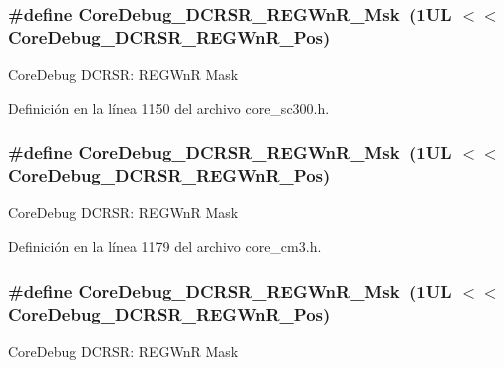 \subsubsection[{\texorpdfstring{Core\+Debug\+\_\+\+D\+C\+R\+S\+R\+\_\+\+R\+E\+G\+Wn\+R\+\_\+\+Msk}{CoreDebug_DCRSR_REGWnR_Msk}}]{\setlength{\rightskip}{0pt plus 5cm}\#define Core\+Debug\+\_\+\+D\+C\+R\+S\+R\+\_\+\+R\+E\+G\+Wn\+R\+\_\+\+Msk~(1\+U\+L $<$$<$ Core\+Debug\+\_\+\+D\+C\+R\+S\+R\+\_\+\+R\+E\+G\+Wn\+R\+\_\+\+Pos)}\hypertarget{group___c_m_s_i_s___core_debug_ga1eef4992d8f84bc6c0dffed1c87f90a5}{}\label{group___c_m_s_i_s___core_debug_ga1eef4992d8f84bc6c0dffed1c87f90a5}
Core\+Debug D\+C\+R\+SR\+: R\+E\+G\+WnR Mask 

Definición en la línea 1150 del archivo core\+\_\+sc300.\+h.

\subsubsection[{\texorpdfstring{Core\+Debug\+\_\+\+D\+C\+R\+S\+R\+\_\+\+R\+E\+G\+Wn\+R\+\_\+\+Msk}{CoreDebug_DCRSR_REGWnR_Msk}}]{\setlength{\rightskip}{0pt plus 5cm}\#define Core\+Debug\+\_\+\+D\+C\+R\+S\+R\+\_\+\+R\+E\+G\+Wn\+R\+\_\+\+Msk~(1\+U\+L $<$$<$ Core\+Debug\+\_\+\+D\+C\+R\+S\+R\+\_\+\+R\+E\+G\+Wn\+R\+\_\+\+Pos)}\hypertarget{group___c_m_s_i_s___core_debug_ga1eef4992d8f84bc6c0dffed1c87f90a5}{}\label{group___c_m_s_i_s___core_debug_ga1eef4992d8f84bc6c0dffed1c87f90a5}
Core\+Debug D\+C\+R\+SR\+: R\+E\+G\+WnR Mask 

Definición en la línea 1179 del archivo core\+\_\+cm3.\+h.

\subsubsection[{\texorpdfstring{Core\+Debug\+\_\+\+D\+C\+R\+S\+R\+\_\+\+R\+E\+G\+Wn\+R\+\_\+\+Msk}{CoreDebug_DCRSR_REGWnR_Msk}}]{\setlength{\rightskip}{0pt plus 5cm}\#define Core\+Debug\+\_\+\+D\+C\+R\+S\+R\+\_\+\+R\+E\+G\+Wn\+R\+\_\+\+Msk~(1\+U\+L $<$$<$ Core\+Debug\+\_\+\+D\+C\+R\+S\+R\+\_\+\+R\+E\+G\+Wn\+R\+\_\+\+Pos)}\hypertarget{group___c_m_s_i_s___core_debug_ga1eef4992d8f84bc6c0dffed1c87f90a5}{}\label{group___c_m_s_i_s___core_debug_ga1eef4992d8f84bc6c0dffed1c87f90a5}
Core\+Debug D\+C\+R\+SR\+: R\+E\+G\+WnR Mask 


